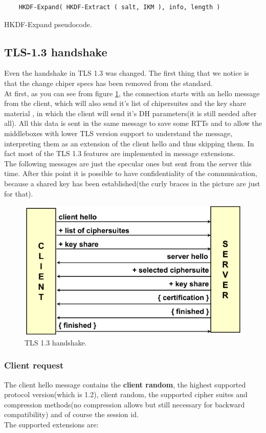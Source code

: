 \begin{listing}[H]
  \begin{verbatim}
    HKDF-Expand( HKDF-Extract ( salt, IKM ), info, length )
  \end{verbatim}
  \caption{HKDF-Expand pseudocode.}
  \label{lst:hkdf-expand}
\end{listing}

\subsection{TLS-1.3 handshake}
Even the handshake in TLS 1.3 was changed. The first thing that we
notice is that the change chiper specs has been removed from the
standard.\\
At first, as you can see from figure \ref{fig:tls-1.3-handshake}, the
connection starts with an hello message from the client, which will
also send it's list of chipersuites and the key share material , in
which the client will send it's DH parameters(it is still needed after
all). All this data is sent in the same message to save some RTTs and
to allow the middleboxes with lower TLS version support to understand 
the message, interpreting them as an extension of the client hello and
thus skipping them. In fact most of the TLS 1.3 features are 
implemented in message extensions.\\
The following messages are just the specular ones but sent from the
server this time. After this point it is possible to have
confidentiality of the communication, because a shared key has been
established(the curly braces in the picture are just for that).\\

\begin{figure}[H]
  \centering
  \includegraphics[width=.6\textwidth]{img/TLS 1-3 handshake.png}
  \caption{TLS 1.3 handshake.}
  \label{fig:tls-1.3-handshake}
\end{figure}

\subsubsection{Client request}
The client hello message contains the \textbf{client random}, the
highest supported protocol version(which is 1.2), client random, the
supported cipher suites and compression methods(no compression allows
but still necessary for backward compatibility) and of course the
session id.\\
The supported extensions are: 


